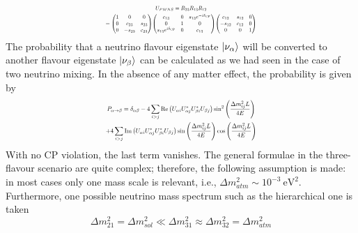 \begin{equation}
\label{eq:upmns}
    \resizebox{0.45\textwidth}{!}{$\begin{gathered}
    U_{PMNS} =  R_{23}R_{13}R_{12} \\
    = {\begin{pmatrix}1&0&0\\0&c_{23}&s_{23}\\0&-s_{23}&c_{23}\end{pmatrix}}{\begin{pmatrix}c_{13}&0&s_{13}e^{-i\delta _{\mathrm {CP} }}\\0&1&0\\ s_{13}e^{i\delta _{\mathrm {CP} }}&0&c_{13}\end{pmatrix}}{\begin{pmatrix}c_{12}&s_{12}&0\\-s_{12}&c_{12}&0\\0&0&1\end{pmatrix}}
    \end{gathered}$}
\end{equation}
The probability that a neutrino flavour eigenstate \(\ket{\nu_\alpha}\) will be converted to another flavour eigenstate \(\ket{\nu _\beta}\) can be calculated as we had seen in the case of two neutrino mixing. In the absence of any matter effect, the probability is given by
\begin{equation}
    \resizebox{0.45\textwidth}{!}{$\begin{gathered}
        P_{\alpha \to \beta} = \delta_{\alpha\beta} - 4 \sum_{i > j} \mathrm{Re}\left(U_{\alpha i}U^* _{\alpha j}U^*_{\beta i}U _{\beta j}\right) \sin ^2 \left(\frac{\Delta m^2 _{ij} L}{4E} \right)\\
        + 4 \sum_{i > j} \mathrm{Im}\left(U_{\alpha i}U^* _{\alpha j}U^*_{\beta i}U _{\beta j}\right) \sin \left(\frac{\Delta m^2 _{ij} L}{4E} \right) \cos \left(\frac{\Delta m^2 _{ij} L}{4E} \right)
    \end{gathered}$}
\end{equation}
With no CP violation, the last term vanishes\cite{Dighe}. The general formulae in the three-flavour scenario are quite complex; therefore, the following assumption is made: in most cases only one mass scale is relevant, i.e., \(\Delta m^2 _{atm} \sim 10^{-3}~\mathrm{eV}^2\). Furthermore, one possible neutrino mass spectrum such as the hierarchical one is taken\cite{zuber2020neutrino}
\begin{equation}
    \Delta m^2 _{21} = \Delta m^2 _{sol} \ll \Delta m^2 _{31} \approx \Delta m^2 _{32} = \Delta m^2 _{atm}
\end{equation}
